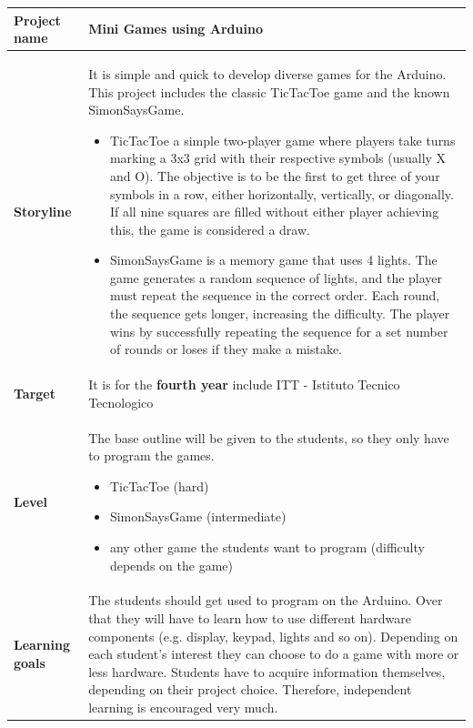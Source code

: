 \documentclass[10pt]{article}
\begin{document}
\begin{longtable}{|p{3.5cm}|p{11cm}|}
  \hline
  \textbf{Project name} & \textbf{Mini Games} using Arduino  \\ \hline
  
  \textbf{Storyline} & It is simple and quick to develop diverse games for the Arduino. This project includes the classic TicTacToe game and the known SimonSaysGame. 
  \begin{itemize}
    \item TicTacToe a simple two-player game where players take turns marking a 3x3 grid with their respective symbols (usually X and O). The objective is to be the first to get three of your symbols in a row, either horizontally, vertically, or diagonally. If all nine squares are filled without either player achieving this, the game is considered a draw.
    \item SimonSaysGame is a memory game that uses 4 lights. The game generates a random sequence of lights, and the player must repeat the sequence in the correct order. Each round, the sequence gets longer, increasing the difficulty. The player wins by successfully repeating the sequence for a set number of rounds or loses if they make a mistake.
  \end{itemize}\\ \hline
  
  \textbf{Target} & It is for the \textbf{fourth year} include ITT - Istituto Tecnico Tecnologico \\ \hline
  
  \textbf{Level} & 
  The base outline will be given to the students, so they only have to program the games.
  \begin{itemize}
    \item TicTacToe (hard)
    \item SimonSaysGame (intermediate)
    \item any other game the students want to program (difficulty depends on the game)
  \end{itemize} \\ \hline
  
  \textbf{Learning goals} & The students should get used to program on the Arduino. Over that they will have to learn how to use different hardware components (e.g. display, keypad, lights and so on). Depending on each student's interest they can choose to do a game with more or less hardware. Students have to acquire information themselves, depending on their project choice. Therefore, independent learning is encouraged very much. \\ \hline
  

\end{longtable}
\end{document}
